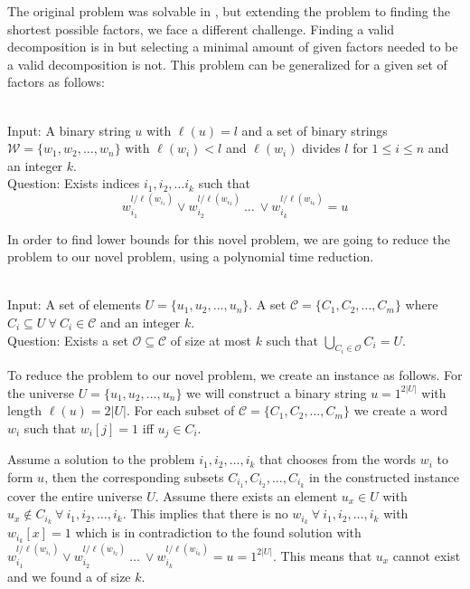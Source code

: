 The original problem was solvable in \LogSpace, but extending the problem to finding the shortest possible factors, we face a different challenge. Finding a valid decomposition is in \LogSpace but selecting a minimal amount of given factors needed to be a valid decomposition is not. This problem can be generalized for a given set of factors as follows:

\begin{defn}{\ \\}
	Input: A binary string $u$ with $\ell(u)= l$ and a set of binary strings $\mathcal{W} = \{w_1, w_2, \dots, w_n\}$ with $\ell(w_i) < l$ and $\ell(w_i)$ divides $l$ for $1 \leq i \leq n$ and an integer $k$.\\
	Question: Exists indices $i_1, i_2, \dots i_k$ such that
	$$w_{i_1}^{l / \ell(w_{i_1})} \lor w_{i_2}^{l / \ell(w_{i_2})} ~\dots~ \lor w_{i_k}^{l / \ell(w_{i_k})} = u $$
\end{defn}

In order to find lower bounds for this novel problem, we are going to reduce the {} problem to our novel {} problem, using a polynomial time reduction.

\begin{defn}{\ \\}
	Input: A set of elements $U = \{u_1, u_2, \dots , u_n\}$. A set $\mathcal{C} = \{C_1, C_2, \dots , C_m\}$ where $C_i \subseteq U ~\forall~ C_i \in \mathcal{C}$ and an integer $k$.\\
	Question: Exists a set $\mathcal{O} \subseteq \mathcal{C}$ of size  at most $k$ such that $\underset{C_i \in \mathcal{O}}{\bigcup}C_i = U$.
\end{defn}

To reduce the {} problem to our novel problem, we create an instance as follows. For the universe $U = \{u_1, u_2, \dots, u_n\}$ we will construct a binary string $u= 1^{2|U|}$ with length $\ell(u) = 2|U|$. For each subset of $\mathcal{C} = \{C_1, C_2, \dots, C_m\}$ we create a word $w_i$ such that $w_i[j] = 1$ iff $u_j \in C_i$. 

Assume a solution to the {} problem $i_1, i_2, \dots, i_k$ that chooses from the words $w_i$ to form $u$, then the corresponding subsets $C_{i_1}, C_{i_2}, \dots, C_{i_k}$ in the constructed {} instance cover the entire universe $U$. Assume there exists an element $u_x \in U$ with $u_x \not \in C_{i_k} ~\forall~ i_1, i_2, \dots, i_k$. This implies that there is no $w_{i_k} ~\forall~ i_1, i_2, \dots, i_k$ with $w_{i_k}[x]=1$ which is in contradiction to the found solution with $w_{i_1}^{l / \ell(w_{i_1})} \lor w_{i_2}^{l / \ell(w_{i_2})} ~\dots~ \lor w_{i_k}^{l / \ell(w_{i_k})} = u = 1^{2|U|}$. This means that $u_x$ cannot exist and we found a {} of size $k$.

